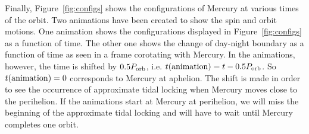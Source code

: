 \documentclass[12pt]{article}
\newcommand{\porb}{P_{\rm orb}}
\begin{document}
Finally, Figure~\ref{fig:configs} shows the configurations of Mercury 
at various times of the orbit. Two animations have been created to show 
the spin and orbit motions. One animation shows the configurations displayed in Figure~\ref{fig:configs} 
as a function of time. The other one shows the change of day-night boundary 
as a function of time as seen in a frame corotating with Mercury.
In the animations, however, the time is shifted by $0.5 \porb$, 
i.e. $t({\rm animation}) = t - 0.5 \porb$. So $t({\rm animation})=0$ corresponds 
to Mercury at aphelion. The shift is made in order to see the occurrence of approximate tidal 
locking when Mercury moves close to the perihelion. If the animations start at Mercury 
at perihelion, we will miss the beginning of the approximate tidal locking and will 
have to wait until Mercury completes one orbit.
\end{document}
